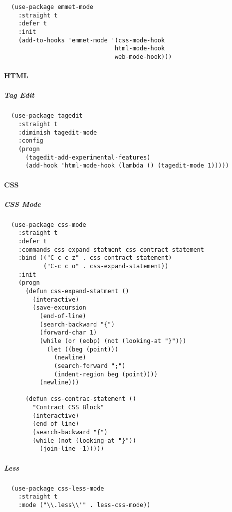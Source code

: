 \documentclass[11pt]{article}
\begin{document}
\begin{verbatim}
  (use-package emmet-mode
    :straight t
    :defer t
    :init
    (add-to-hooks 'emmet-mode '(css-mode-hook
                               html-mode-hook
                               web-mode-hook)))
\end{verbatim}

\paragraph*{HTML}
\label{sec:orgc0eb211}
\subparagraph*{Tag Edit}
\label{sec:org390cb0e}

\begin{verbatim}
  (use-package tagedit
    :straight t
    :diminish tagedit-mode
    :config
    (progn
      (tagedit-add-experimental-features)
      (add-hook 'html-mode-hook (lambda () (tagedit-mode 1)))))
\end{verbatim}

\paragraph*{CSS}
\label{sec:org74dbce2}
\subparagraph*{CSS Mode}
\label{sec:orgdbff771}

\begin{verbatim}
  (use-package css-mode
    :straight t
    :defer t
    :commands css-expand-statment css-contract-statement
    :bind (("C-c c z" . css-contract-statement)
           ("C-c c o" . css-expand-statement))
    :init
    (progn
      (defun css-expand-statment ()
        (interactive)
        (save-excursion
          (end-of-line)
          (search-backward "{")
          (forward-char 1)
          (while (or (eobp) (not (looking-at "}")))
            (let ((beg (point)))
              (newline)
              (search-forward ";")
              (indent-region beg (point))))
          (newline)))

      (defun css-contrac-statement ()
        "Contract CSS Block"
        (interactive)
        (end-of-line)
        (search-backward "{")
        (while (not (looking-at "}"))
          (join-line -1)))))
\end{verbatim}

\subparagraph*{Less}
\label{sec:orge72d2b6}

\begin{verbatim}
  (use-package css-less-mode
    :straight t
    :mode ("\\.less\\'" . less-css-mode))
\end{verbatim}
\end{document}
